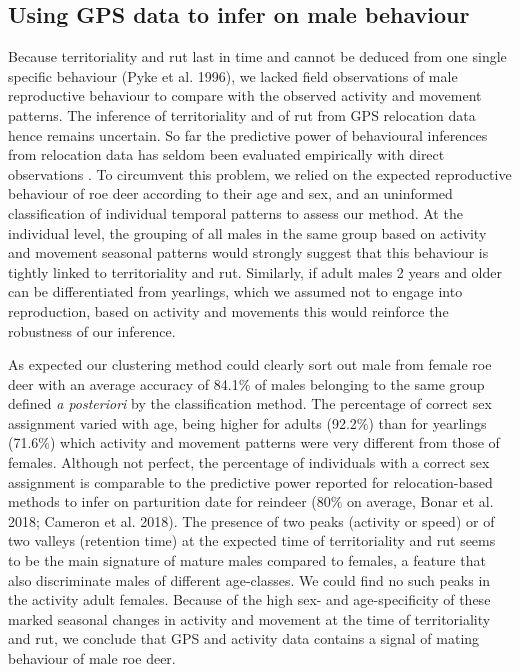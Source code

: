 \documentclass[a4paper,11pt]{article}
\begin{document}
\subsection*{Using GPS data to infer on male behaviour}

 Because territoriality and rut last in time and cannot be deduced from one single specific behaviour (Pyke et al. 1996), we lacked field observations of male reproductive behaviour to compare with the observed activity and movement patterns. The inference of territoriality and of rut from GPS relocation data hence remains uncertain. So far the predictive power of behavioural inferences from relocation data has seldom been evaluated empirically with direct observations \citep[but see ][on female parturition for instance]{??}. To circumvent this problem, we relied on the expected reproductive behaviour of roe deer according to their age and sex, and an uninformed classification of individual temporal patterns to assess our method. At the individual level, the grouping of all males in the same group based on activity and movement seasonal patterns would strongly suggest that this behaviour is tightly linked  to territoriality and rut. Similarly, if adult males 2 years and older can be differentiated from yearlings, which we assumed not to engage into reproduction, based on activity and movements this would reinforce the robustness of our inference. 


As expected our clustering method could clearly sort out male from female roe deer with an average accuracy of 84.1\% of males belonging to the same group defined \textit{a posteriori} by the classification method. The percentage of correct sex assignment varied with age, being higher for adults (92.2\%) than for yearlings (71.6\%) which activity and movement patterns were very different from those of females. Although not perfect, the percentage of individuals with a correct sex assignment is comparable to the predictive power reported for relocation-based methods to infer on parturition date for reindeer (80\% on average, Bonar et al. 2018; Cameron et al. 2018). The presence of two peaks (activity or speed) or of two valleys (retention time) at the expected time of territoriality and rut seems to be the main signature of mature males compared to females, a feature that also discriminate males of different age-classes. We could find no such peaks in the activity adult females. Because of the high sex- and age-specificity of these marked seasonal changes in activity and movement at the time of territoriality and rut, we conclude that GPS and activity data contains a signal of mating behaviour of male roe deer.
\end{document}
